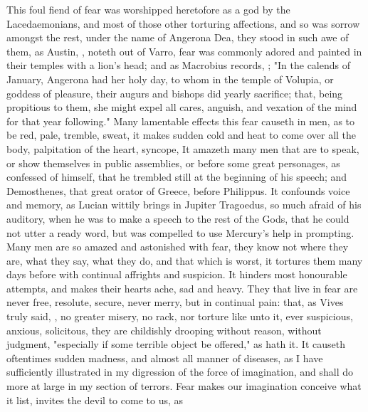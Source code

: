 This foul fiend of fear was worshipped heretofore as a god by the
Lacedaemonians, and most of those other torturing
affections, and so was sorrow amongst the rest, under the
name of Angerona Dea, they stood in such awe of them, as Austin,
, noteth out of Varro,
fear was commonly adored and painted in their temples with
a lion's head; and as Macrobius records, ; "In the calends of January, Angerona had
her holy day, to whom in the temple of Volupia, or goddess of pleasure, their
augurs and bishops did yearly sacrifice; that, being propitious to them, she
might expel all cares, anguish, and vexation of the mind for that year
following." Many lamentable effects this fear causeth in men, as to be red,
pale, tremble, sweat, it makes sudden cold and heat to
come over all the body, palpitation of the heart, syncope, \etc{} It amazeth
many men that are to speak, or show themselves in public assemblies, or before
some great personages, as \Tully{} confessed of himself, that he trembled still at
the beginning of his speech; and Demosthenes, that great orator of Greece,
before Philippus. It confounds voice and memory, as Lucian wittily brings in
Jupiter Tragoedus, so much afraid of his auditory, when he was to make a speech
to the rest of the Gods, that he could not utter a ready word, but was
compelled to use Mercury's help in prompting. Many men are so amazed and
astonished with fear, they know not where they are, what they say,
what they do, and that which is worst, it tortures them
many days before with continual affrights and suspicion. It hinders most
honourable attempts, and makes their hearts ache, sad and heavy. They that live
in fear are never free, resolute, secure, never merry, but
in continual pain: that, as Vives truly said, , no greater misery, no rack, nor torture like unto it, ever suspicious,
anxious, solicitous, they are childishly drooping without reason, without
judgment, "especially if some terrible object be offered,"
as \Plutarch{} hath it. It causeth oftentimes sudden madness, and almost all
manner of diseases, as I have sufficiently illustrated in my
digression of the force of imagination, and shall do more
at large in my section of terrors. Fear makes our
imagination conceive what it list, invites the devil to come to us, as
